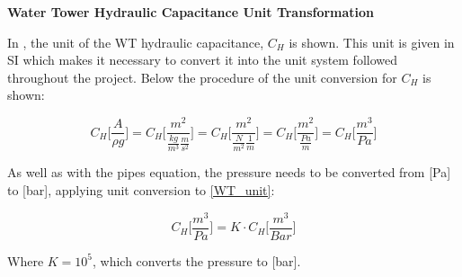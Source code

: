 \textbf{Water Tower Hydraulic Capacitance Unit Transformation}

In , the unit of the WT hydraulic capacitance, $C_H$ is shown. This unit is given in SI which makes it necessary to convert it into the unit system followed throughout the project. Below the procedure of the unit conversion for $C_H$ is shown: 

\begin{equation}
	C_H \Bigg[\frac{A}{\rho g}\Bigg] = C_H \Bigg[\frac{m^2}{\frac{kg}{m^3} \frac{m}{s^2}}\Bigg]= C_H \Bigg[\frac{m^2}{\frac{N}{m^2} \frac{1}{m}}\Bigg] =  C_H \Bigg[\frac{m^2}{\frac{Pa}{m}}\Bigg] = C_H \Bigg[\frac{m^3}{Pa}\Bigg]
	\label{WT_unit}
\end{equation}


As well as with the pipes equation, the pressure needs to be converted from [Pa] to [bar], applying unit conversion to \eqref{WT_unit}:

\begin{equation}
	C_H \Bigg[\frac{m^3}{Pa}\Bigg] = K \cdot C_H \Bigg[\frac{m^{3}}{Bar}\Bigg]
	\label{WT_unit_final}
\end{equation}


Where $K = 10^5$, which converts the pressure to [bar]. 